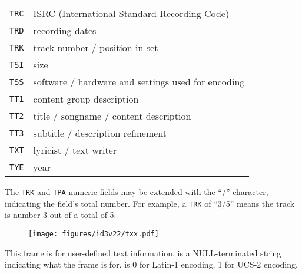 \begin{table}[h]
{\begin{tabular}{|r|l|}
\texttt{TRC} & ISRC (International Standard Recording Code) \\
\texttt{TRD} & recording dates \\
\texttt{TRK} & track number / position in set \\
\texttt{TSI} & size \\
\texttt{TSS} & software / hardware and settings used for encoding \\
\texttt{TT1} & content group description \\
\texttt{TT2} & title / songname / content description \\
\texttt{TT3} & subtitle / description refinement \\
\texttt{TXT} & lyricist / text writer \\
\texttt{TYE} & year \\
\hline
\end{tabular}
}
\end{table}
\par
The \texttt{TRK} and \texttt{TPA} numeric fields may be extended
with the ``/'' character, indicating the field's total number.
For example, a \texttt{TRK} of ``3/5'' means the track is number
3 out of a total of 5.

\clearpage

\begin{figure}[h]
\texttt{[image: figures/id3v22/txx.pdf]}
\end{figure}
This frame is for user-defined text information.
 is a NULL-terminated string indicating
what the frame is for.
 is 0 for Latin-1 encoding, 1 for UCS-2 encoding.

